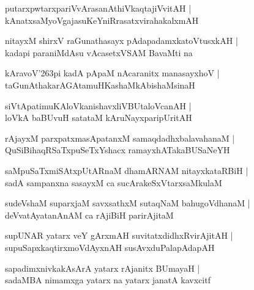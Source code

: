 \documentclass[twoside,12pt,openright]{book}
\def\S{\char'263}
\newcounter{shloka}[chapter]
\begin{document}
\begin{shloka}%
putarxpwtarxpariVvArasanAthiVkaqtajiVvitAH |\\
kAnatxsaMyoVgajasuKeYniRrasatxvirahakalxmAH 
\end{shloka}

\begin{shloka}%
nitayxM shirxV raGunathasayx pAdapadamxkatoVtusxkAH |\\
kadapi paraniMdAsu vAcasetxVSAM BavaMti na 
\end{shloka}

\begin{shloka}%
kAravoV\S pi kadA pApaM nAcaranitx manasayxhoV |\\
taGunAthakarAGAtamuHKashaMkAbishaMsinaH 
\end{shloka}

\begin{shloka}%
siVtApatimuKAloVkanishavxliVBUtaloVcanAH |\\
loVkA baBUvuH satataM kAruNayxparipUritAH
\end{shloka}

\begin{shloka}%
rAjayxM parxpatxmasApatanxM samaqdadhxbalavahanaM |\\
QuSiBihaqRSaTxpuSeTxYshacx ramayxhATakaBUSaNeYH
\end{shloka}

\begin{shloka}%
saMpuSaTxmiSAtxpUtARnaM dhamARNAM nitayxkataRBiH |\\
sadA sampanxna sasayxM ca sucArakeSxVtarxsaMkulaM  
\end{shloka}

\begin{shloka}%
sudeVshaM suparxjaM savxsathxM sutaqNaM bahugoVdhanaM |\\
deVvatAyatanAnAM ca rAjiBiH parirAjitaM
\end{shloka}


\begin{shloka}%
supUNAR yatarx veY gArxmAH suvitatxdidhxRvirAjitAH |\\
supuSapxkaqtirxmoVdAyxnAH susAvxduPalapAdapAH 
\end{shloka}

\begin{shloka}%
sapadimxnivkakAsArA yatarx rAjanitx BUmayaH |\\
sadaMBA nimamxga yatarx na yatarx janatA kavxcitf 
\end{shloka}
\end{document}
